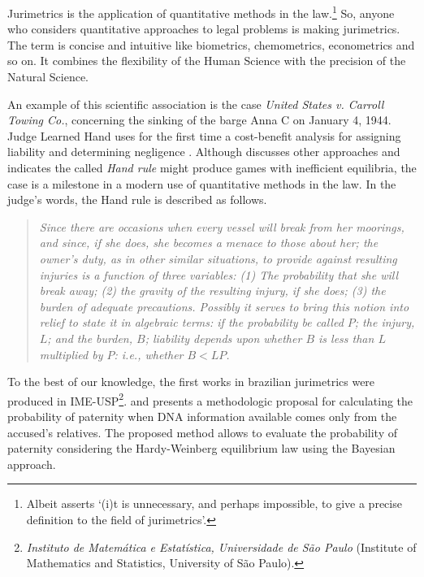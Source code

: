\documentclass[a4paper]{exam}
\theoremstyle{plain}
\begin{document}
Jurimetrics is the application of quantitative methods in the law.\footnote{Albeit \cite[p. 8]{loevinger1963jurimetrics} asserts `(i)t is unnecessary, and perhaps impossible, to give a precise definition to the field of jurimetrics'.} So, anyone who considers quantitative approaches to legal problems is making jurimetrics. The term is concise and intuitive like biometrics, chemometrics, econometrics and so on. It combines the flexibility of the Human Science with the precision of the Natural Science. 

An example of this scientific association is the case \textit{United States v. Carroll Towing Co.}, concerning the sinking of the barge Anna C on January 4, 1944. Judge Learned Hand uses for the first time a cost-benefit analysis for assigning liability and determining negligence \cite{hand1947united}. Although \cite{feldman2005hand} discusses other approaches and indicates the called \textit{Hand rule} might produce games with inefficient equilibria, the case is a milestone in a modern use of quantitative methods in the law. In the judge's words, the Hand rule is described as follows.
\begin{quote}
\textit{Since there are occasions when every vessel will break from her moorings, and since, if she does, she becomes a menace to those about her; the owner's duty, as in other similar situations, to provide against resulting injuries is a function of three variables: (1) The probability that she will break away; (2) the gravity of the resulting injury, if she does; (3) the burden of adequate precautions. Possibly it serves to bring this notion into relief to state it in algebraic terms: if the probability be called $P$; the injury, $L$; and the burden, $B$; liability depends upon whether $B$ is less than $L$ multiplied by $P$: i.e., whether $B < LP$.} \cite[online]{hand1947united}
 \end{quote}

To the best of our knowledge, the first works in brazilian jurimetrics were produced in IME-USP\footnote{\textit{Instituto de Matemática e Estatística, Universidade de São Paulo} (Institute of Mathematics and Statistics, University of São Paulo).}. \cite{montoya1998prob} and \cite{montoya2001unconditional} presents a methodologic proposal for calculating the probability of paternity when DNA information available comes only from the accused's relatives. The proposed method allows to evaluate the probability of paternity considering the Hardy-Weinberg equilibrium law using the Bayesian approach. 
\end{document}
